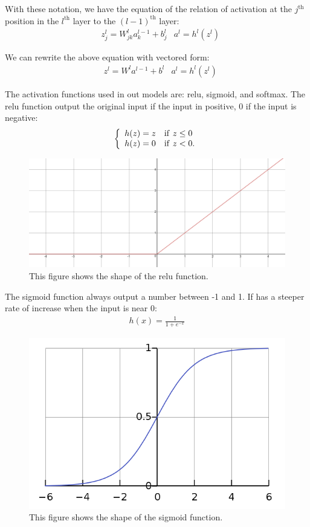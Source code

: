 \documentclass[11pt,letterpaper]{article}
\begin{document}
With these notation, we have the equation of the relation of activation at the $j^{\text{th}}$ position in the $l^{\text{th}}$ layer to the $(l-1)^{\text{th}}$ layer:
\begin{align}
&z_j^l=W^l_{jk}a_k^{l-1}+b^l_j &a^l=h^l(z^l) \label{eq:1}
\end{align}

We can rewrite the above equation with vectored form:
\begin{align*}
&z^l=W^la^{l-1}+b^l &a^l=h^l(z^l)
\end{align*}

The activation functions used in out models are: relu, sigmoid, and softmax. The relu function output the original input if the input in positive, 0 if the input is negative:
\begin{align}
\left\{
	\begin{array}{ll}
	h(z)=z&{\rm if~} z\leq 0\\
	h(z)=0&{\rm if~} z<0.
	\end{array}
\right.
\end{align}

\begin{figure}[H]
\centering
\includegraphics[scale=.15]{relu.png}
\caption{This figure shows the shape of the relu function.}
\end{figure}

The sigmoid function always output a number between -1 and 1. If has a steeper rate of increase when the input is near 0:
\begin{align}
h(x)=\frac{1}{1+e^{-x}}
\end{align}

\begin{figure}[H]
\centering
\includegraphics[scale=.3]{Logistic-curve.png}
\caption{This figure shows the shape of the sigmoid function.}
\end{figure}
\end{document}
